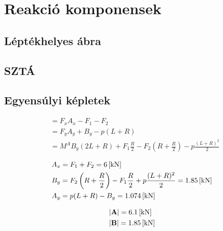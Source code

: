 \section{Reakció komponensek}

\subsection{Léptékhelyes ábra}

\begin{tikzpicture}
\end{tikzpicture}

\subsection{SZTÁ}

\newpage

\subsection{Egyensúlyi képletek}

\begin{align*}
	&\equal{F_x}{A_x - F_1 - F_2} \\
	&\equal{F_y}{A_y + B_y - p(L+R)} \\
	&\equal{M^A}
	{B_y(2L+R) + F_1 \frac{R}{2} - F_2 \left(R+\frac{R}{2}\right) - p\frac{(L+R)^2}{2}}
\end{align*}

\begin{align*}
	&A_x = F_1 + F_2 = \kn{6} \\
	&B_y 
		= F_2 \left(R + \frac{R}{2}\right) - F_1\frac{R}{2} + p\frac{(L+R)^2}{2} 
		= \kn{1.85} \\
	&A_y = p(L+R) - B_y = \kn{1.074} \\
\end{align*}

\begin{align*}
	&|\textbf{A}| = \kn{6.1} \\
	&|\textbf{B}| = \kn{1.85} 
\end{align*}
